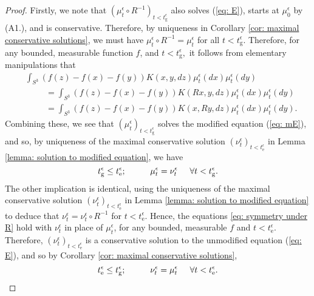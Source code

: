 \documentclass[11pt, notitlepage]{article}
\begin{document}
\begin{proof} Firstly, we note that $( \mu^\epsilon_t \circ R^{-1})_{t<t_\mathrm{g}^\epsilon}$ also solves (\ref{eq: E}), starts at $\mu^\epsilon_0$ by (A1.), and is conservative. Therefore, by uniqueness in Corollary \ref{cor: maximal conservative solutions}, we must have $\mu^\epsilon_t \circ R^{-1}=\mu^\epsilon_t$ for all $t<t_\mathrm{g}^\epsilon.$ Therefore, for any bounded, measurable function $f$, and $t<t^\epsilon_\mathrm{g},$ it follows from elementary manipulations that
\begin{equation} \begin{split} \label{eq: symmetry under R}
        &\int_{S^3} (f(z)-f(x)-f(y))K(x,y,dz)\mu^\epsilon_t(dx)\mu^\epsilon_t(dy)
 \\ &\hspace{1cm}=  \int_{S^3} (f(z)-f(x)-f(y))K(Rx,y,dz)\mu^\epsilon_t(dx)\mu^\epsilon_t(dy) \\
 &\hspace{1cm}=  \int_{S^3} (f(z)-f(x)-f(y))K(x,Ry,dz)\mu^\epsilon_t(dx)\mu^\epsilon_t(dy).
\end{split} \end{equation} Combining these, we see that $(\mu^\epsilon_t)_{t<t^\epsilon_\mathrm{g}}$ solves the modified equation (\ref{eq: mE}), and so, by uniqueness of the maximal conservative solution $(\nu^\epsilon_t)_{t<t_\mathrm{e}^\epsilon}$ in Lemma \ref{lemma: solution to modified equation}, we have \begin{equation}
        t^\epsilon_\mathrm{g} \leq t_\mathrm{e}^\epsilon; \hspace{1cm} \mu^\epsilon_t=\nu^\epsilon_t \hspace{0.5cm}\forall t<t^\epsilon_\mathrm{g}.
    \end{equation} The other implication is identical, using the uniqueness of the maximal conservative solution $(\nu^\epsilon_t)_{t<t_\mathrm{e}^\epsilon}$ in Lemma \ref{lemma: solution to modified equation} to deduce that $\nu^\epsilon_t= \nu^\epsilon_t\circ R^{-1}$ for $t<t_\mathrm{e}^\epsilon$. Hence, the equations \eqref{eq: symmetry under R} hold with $\nu^\epsilon_t$ in place of $\mu^\epsilon_t$, for any bounded, measurable $f$ and $t<t_\mathrm{e}^\epsilon.$ Therefore, $(\nu^\epsilon_t)_{t<t_\mathrm{e}^\epsilon}$ is a conservative solution to the unmodified equation (\ref{eq: E}), and so by Corollary \ref{cor: maximal conservative solutions}, \begin{equation}
        t_\mathrm{e}^\epsilon \leq t^\epsilon_\mathrm{g}; \hspace{1cm} \nu^\epsilon_t=\mu^\epsilon_t \hspace{0.5cm}\forall t<t_\mathrm{e}^\epsilon.
    \end{equation} \end{proof}  
    
\end{document}
